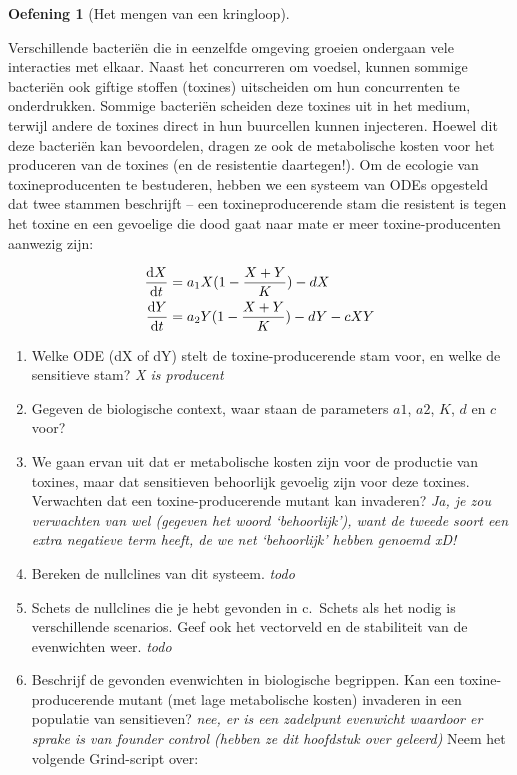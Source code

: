 \documentclass[
  a4paper,
]{scrbook}
\providecommand{\tightlist}{%
  \setlength{\itemsep}{0pt}\setlength{\parskip}{0pt}}\usepackage{longtable,booktabs,array}
\theoremstyle{definition}
\newtheorem{exercise}{Oefening}[chapter]
\theoremstyle{remark}
\begin{document}
\begin{exercise}[Het mengen van een
kringloop]
\begin{tcolorbox}
Verschillende bacteriën die in eenzelfde omgeving groeien ondergaan vele
interacties met elkaar. Naast het concurreren om voedsel, kunnen sommige
bacteriën ook giftige stoffen (toxines) uitscheiden om hun concurrenten
te onderdrukken. Sommige bacteriën scheiden deze toxines uit in het
medium, terwijl andere de toxines direct in hun buurcellen kunnen
injecteren. Hoewel dit deze bacteriën kan bevoordelen, dragen ze ook de
metabolische kosten voor het produceren van de toxines (en de
resistentie daartegen!). Om de ecologie van toxineproducenten te
bestuderen, hebben we een systeem van ODEs opgesteld dat twee stammen
beschrijft -- een toxineproducerende stam die resistent is tegen het
toxine en een gevoelige die dood gaat naar mate er meer
toxine-producenten aanwezig zijn:

\begin{align}
\mathchoice{\frac{\mathrm{d}X}
{\mathrm{d}t}}{\mathrm{d}X/\mathrm{d}t}
{\mathrm{d}X/\mathrm{d}t}
{\mathrm{d}X/\mathrm{d}t} &= a_{1}X(1-\frac{X+Y}{K}) - dX \\
\mathchoice{\frac{\mathrm{d}Y}
{\mathrm{d}t}}{\mathrm{d}Y/\mathrm{d}t}
{\mathrm{d}Y/\mathrm{d}t}
{\mathrm{d}Y/\mathrm{d}t} &= a_{2}Y(1-\frac{X+Y}{K}) - dY - cXY
\end{align}

\begin{enumerate}
\def\labelenumi{\alph{enumi}.}
\tightlist
\item
  Welke ODE (dX of dY) stelt de toxine-producerende stam voor, en welke
  de sensitieve stam? \emph{X is producent}
\item
  Gegeven de biologische context, waar staan de parameters \(a1\),
  \(a2\), \(K\), \(d\) en \(c\) voor?
\item
  We gaan ervan uit dat er metabolische kosten zijn voor de productie
  van toxines, maar dat sensitieven behoorlijk gevoelig zijn voor deze
  toxines. Verwachten dat een toxine-producerende mutant kan invaderen?
  \emph{Ja, je zou verwachten van wel (gegeven het woord `behoorlijk'),
  want de tweede soort een extra negatieve term heeft, de we net
  `behoorlijk' hebben genoemd xD!}
\item
  Bereken de nullclines van dit systeem. \emph{todo}
\item
  Schets de nullclines die je hebt gevonden in c.~Schets als het nodig
  is verschillende scenarios. Geef ook het vectorveld en de stabiliteit
  van de evenwichten weer. \emph{todo}
\item
  Beschrijf de gevonden evenwichten in biologische begrippen. Kan een
  toxine-producerende mutant (met lage metabolische kosten) invaderen in
  een populatie van sensitieven? \emph{nee, er is een zadelpunt
  evenwicht waardoor er sprake is van founder control (hebben ze dit
  hoofdstuk over geleerd)} Neem het volgende Grind-script over:
\end{enumerate}


\end{tcolorbox}
\end{exercise}
\end{document}
